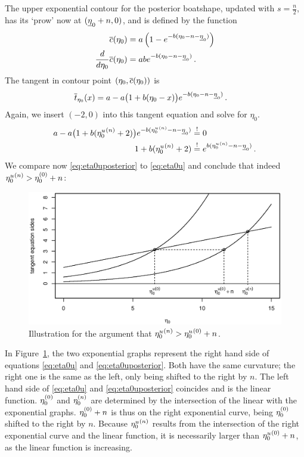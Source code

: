 The upper exponential contour for the posterior boatshape,
updated with $s = \frac{n}{2}$, has its `prow' now at $(\underline{\eta}_0 + n, 0)$,
and is defined by the function
\begin{align*}
\overline{c}(\eta_0) &= a \left( 1 - e^{-b(\eta_0 - n -\underline{\eta}_0)} \right) \\
\frac{d}{d\eta_0} \overline{c}(\eta_0) &= ab e^{-b(\eta_0 - n - \underline{\eta}_0)} \,.
\end{align*}
The tangent in contour point $(\eta_0,\overline{c}(\eta_0))$ is
\begin{align*}
\overline{t}_{\eta_0}(x) &= a - a \big(1 + b(\eta_0-x)\big) e^{-b(\eta_0 - n - \underline{\eta}_0)} \,.
\end{align*}
Again, we insert $(-2,0)$ into this tangent equation and solve for $\eta_0$.
\begin{align}
a - a \big(1 + b({\eta_0^u}^{(n)} + 2)\big) e^{-b({\eta_0^u}^{(n)} - n - \underline{\eta}_0)} &\stackrel{!}{=} 0 \nonumber\\
1 + b({\eta_0^u}^{(n)} + 2) &\stackrel{!}{=} e^{b({\eta_0^u}^{(n)} - n - \underline{\eta}_0)} \,.\label{eq:eta0uposterior}
\end{align}
We compare now \eqref{eq:eta0uposterior} to \eqref{eq:eta0u} and conclude
that indeed ${\eta_0^u}^{(n)} > \eta_0^{(0)} + n$:
\begin{figure}
\centering
\includegraphics[width=\textwidth]{R/prior-vs-posterior-eta0u.eps}
\caption{Illustration for the argument that ${\eta_0^u}^{(n)} > {\eta_0^u}^{(0)} + n$.}
\label{fig:spda1}
\end{figure}
In Figure~\ref{fig:spda1}, the two exponential graphs 
represent the right hand side of equations \eqref{eq:eta0u} and \eqref{eq:eta0uposterior}.
Both have the same curvature; the right one is the same as the left, only being shifted to the right by $n$.
The left hand side of \eqref{eq:eta0u} and \eqref{eq:eta0uposterior} coincides and is the linear function.
$\eta_0^{(0)}$ and $\eta_0^{(n)}$ are determined by the intersection of the linear with the exponential graphs.
$\eta_0^{(0)} + n$ is thus on the right exponential curve, being $\eta_0^{(0)}$ shifted to the right by $n$.
Because ${\eta_0^u}^{(n)}$ results from the intersection of the right exponential curve and the linear function,
it is necessarily larger than ${\eta_0^u}^{(0)} + n$, as the linear function is increasing.

